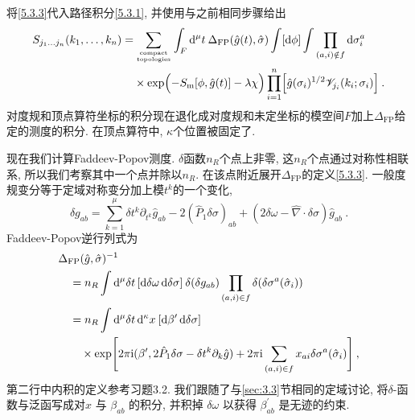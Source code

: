 将\eqref{5.3.3}代入路径积分\eqref{5.3.1}, 并使用与之前相同步骤给出
	\begin{align}
		S_{j_{1} \ldots j_{n}}(k_{1}, \ldots, k_{n})=& \sum_{\text{compact}\atop \text{topologies} } \int_{F} \mathrm{d}^{\mu} t \: 
		\Delta_{\mathrm{FP}}(\hat{g}(t), \hat{\sigma}) \int[\mathrm{d} \phi] \int \prod_{(a, i) \notin f} \mathrm{d} \sigma_{i}^{a}  \nonumber \\	
		&\times \exp \Bigl(-S_{\mathrm{m}}[\phi, \hat{g}(t)]-\lambda \chi\Bigr)
		 \prod_{i=1}^{n}\Bigl[\hat{g}(\sigma_{i})^{1 / 2} \mathscr{V}_{j_{i}}(k_{i} ; \sigma_{i})\Bigr] \:. \label{5.3.4}
	\end{align}
对度规和顶点算符坐标的积分现在退化成对度规和未定坐标的模空间$F$加上$\Delta_{\mathrm{FP}} $给定的测度的积分. 在顶点算符中, $\kappa$个位置被固定了.

现在我们计算Faddeev-Popov测度. $\delta$函数$n_{R}$个点上非零, 这$n_{R}$个点通过对称性相联系, 所以我们考察其中一个点并除以$n_{R}$. 
在该点附近展开$\Delta_{\mathrm{FP}}$的定义\eqref{5.3.3}. 一般度规变分等于定域对称变分加上模$t^{k}$的一个变化,
\begin{equation}
	\delta g_{a b}=\sum_{k=1}^{\mu} \delta t^{k} \partial_{t^{k}} \hat{g}_{a b}-2(\hat{P}_{1} \delta \sigma)_{a b}+(2 \delta \omega-\hat{\nabla} \cdot \delta \sigma) \hat{g}_{a b} \:. \label{5.3.5}
\end{equation}
Faddeev-Popov逆行列式为
	\begin{align}
		&\Delta_{\mathrm{FP}}(\hat{g}, \hat{\sigma})^{-1} \nonumber \\
		&\quad =n_{R} \int \mathrm{d}^{\mu} \delta t\,[\mathrm{d} \delta \omega\, \mathrm{d} \delta \sigma]\: \delta(\delta g_{a b}) 
		\prod_{(a, i) \in f} \delta(\delta \sigma^{a}(\hat{\sigma}_{i})) \nonumber \\
		&\quad =n_{R}  \int \mathrm{d}^{\mu} \delta t\, \mathrm{d}^{\kappa} x \: [\mathrm{d} \beta^{\prime} \,\mathrm{d} \delta \sigma] \nonumber  \\
		&\qquad \times \exp \Biggl[2 \pi \mathrm{i} (\beta^{\prime}, 2 \hat{P}_{1} \delta \sigma-\delta t^{k} \partial_{k} \hat{g})
		+2 \pi \mathrm{i} \sum_{(a, i) \in f} x_{a i} \delta \sigma^{a}(\hat{\sigma}_{i})\Biggr] \:, \label{5.3.6}
	\end{align}
第二行中内积的定义参考习题3.2. 我们跟随了与\ref{sec:3.3}节相同的定域讨论, 将$\delta$-函数与泛函写成对$x$ 与 $\beta_{a b}$ 的积分, 并积掉 $\delta \omega$ 以获得 $\beta_{a b}^{\prime}$ 是无迹的约束.

